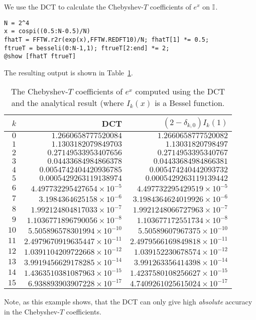 \begin{example}\label{Example:DCT}
We use the DCT to calculate the Chebyshev-$T$ coefficients of $e^x$ on $\mathbb{I}$.
\begin{verbatim}
N = 2^4
x = cospi((0.5:N-0.5)/N)
fhatT = FFTW.r2r(exp(x),FFTW.REDFT10)/N; fhatT[1] *= 0.5;
ftrueT = besseli(0:N-1,1); ftrueT[2:end] *= 2;
@show [fhatT ftrueT]
\end{verbatim}
The resulting output is shown in Table~\ref{table:ChebyshevTExponential}.
\begin{table}[htdp]
\caption{The Chebyshev-$T$ coefficients of $e^x$ computed using the DCT and the analytical result (where $I_k(x)$ is a Bessel function.}
\begin{center}
\begin{tabular}{rrr}
\hline
$k$ & DCT & $(2-\delta_{k,0})I_k(1)$\\
\hline
$0$ & $1.2660658777520084$ & $1.2660658777520082$\\
$1$ & $1.1303182079849703$ & $1.13031820798497$\\
$2$ & $0.27149533953407656$ & $0.2714953395340767$\\
$3$ & $0.04433684984866378$ & $0.04433684984866381$\\
$4$ & $0.0054742404420936785$ & $0.005474240442093732$\\
$5$ & $0.0005429263119138974$ & $0.0005429263119139442$\\
$6$ & $4.497732295427654\times10^{-5}$ & $4.497732295429519\times10^{-5}$\\
$7$ & $3.1984364625158\times10^{-6}$ & $3.1984364624019926\times10^{-6}$\\
$8$ & $1.992124804817033\times10^{-7}$ & $1.9921248066727963\times10^{-7}$\\
$9$ & $1.1036771896790056\times10^{-8}$ & $1.103677172551734\times10^{-8}$\\
$10$ & $5.505896578301994\times10^{-10}$ & $5.50589607967375\times10^{-10}$\\
$11$ & $2.4979670919635447\times10^{-11}$ & $2.4979566169849818\times10^{-11}$\\
$12$ & $1.0391104209722668\times10^{-12}$ & $1.039152230678574\times10^{-12}$\\
$13$ & $3.9919456629178285\times10^{-14}$ & $3.991263356414398\times10^{-14}$\\
$14$ & $1.4363510381087963\times10^{-15}$ & $1.4237580108256627\times10^{-15}$\\
$15$ & $6.938893903907228\times10^{-17}$ & $4.7409261025615024\times10^{-17}$\\
\hline
\end{tabular}
\end{center}
\label{table:ChebyshevTExponential}
\end{table}%
Note, as this example shows, that the DCT can only give high {\em absolute} accuracy in the Chebyshev-$T$ coefficients.
\end{example}

